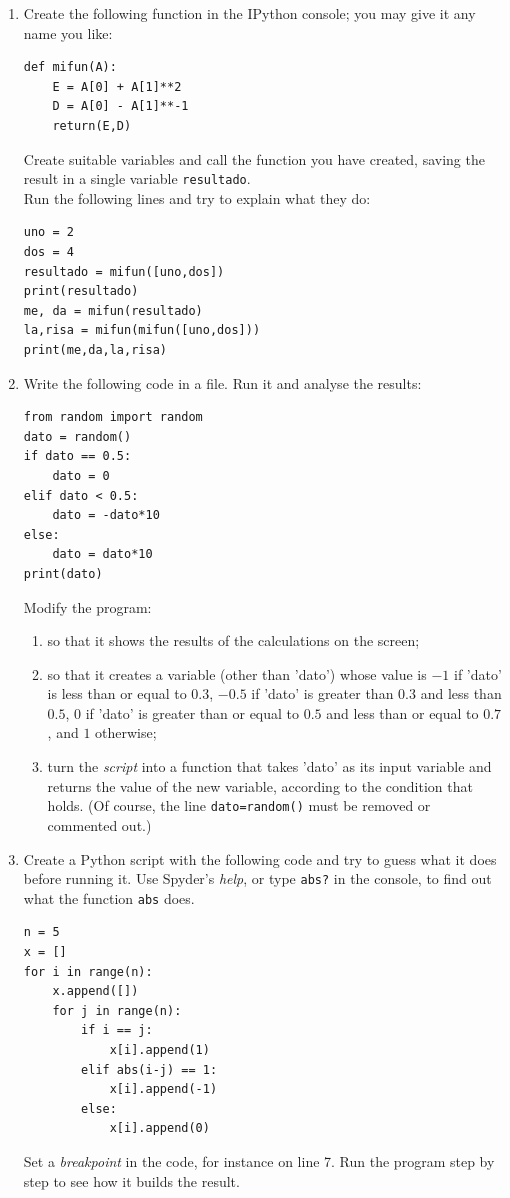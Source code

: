 \begin{enumerate}
\item Create the following function in the IPython console; you may give it any name you like:
\begin{verbatim}
def mifun(A):
    E = A[0] + A[1]**2
    D = A[0] - A[1]**-1
    return(E,D)
\end{verbatim}

Create suitable variables and call the function you have created, saving the result in a single variable \texttt{resultado}.\\
Run the following lines and try to explain what they do:\\
\begin{verbatim}
uno = 2
dos = 4
resultado = mifun([uno,dos])
print(resultado)
me, da = mifun(resultado)
la,risa = mifun(mifun([uno,dos]))
print(me,da,la,risa)
\end{verbatim}

\item Write the following code in a file. Run it and analyse the results:
\begin{verbatim}
from random import random
dato = random()
if dato == 0.5:
    dato = 0
elif dato < 0.5:
    dato = -dato*10
else:
    dato = dato*10
print(dato)
\end{verbatim}

Modify the program:
\begin{enumerate}
\item so that it shows the results of the calculations on the screen;
\item so that it creates a variable (other than 'dato') whose value is $-1$ if 'dato' is less than or equal to $0.3$, $-0.5$ if 'dato' is greater than $0.3$ and less than $0.5$, $0$ if 'dato' is greater than or equal to $0.5$ and less than or equal to $0.7$, and $1$ otherwise;
\item turn the \emph{script} into a function that takes 'dato' as its input variable and returns the value of the new variable, according to the condition that holds. (Of course, the line \verb|dato=random()| must be removed or commented out.)
\end{enumerate}

\item Create a Python script with the following code and try to guess what it does before running it. Use Spyder's \emph{help}, or type \texttt{abs?} in the console, to find out what the function \verb|abs| does.
\begin{verbatim}
n = 5
x = []
for i in range(n):
    x.append([])
    for j in range(n):
        if i == j:
            x[i].append(1)
        elif abs(i-j) == 1:
            x[i].append(-1)
        else:
            x[i].append(0)
\end{verbatim}
Set a \emph{breakpoint} in the code, for instance on line 7. Run the program step by step to see how it builds the result.


\end{enumerate}
